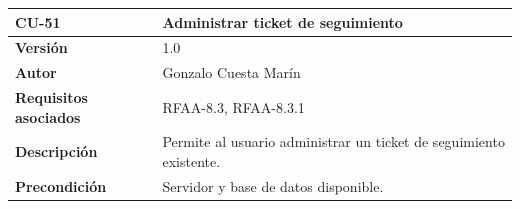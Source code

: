 \documentclass[
]{article}
\begin{document}
\begin{longtable}[]{@{}ll@{}}
\toprule
\begin{minipage}[b]{0.26\columnwidth}\raggedright
\textbf{CU-51}\strut
\end{minipage} & \begin{minipage}[b]{0.68\columnwidth}\raggedright
\textbf{Administrar ticket de seguimiento}\strut
\end{minipage}\tabularnewline
\midrule
\endhead
\begin{minipage}[t]{0.26\columnwidth}\raggedright
\textbf{Versión}\strut
\end{minipage} & \begin{minipage}[t]{0.68\columnwidth}\raggedright
1.0\strut
\end{minipage}\tabularnewline
\begin{minipage}[t]{0.26\columnwidth}\raggedright
\textbf{Autor}\strut
\end{minipage} & \begin{minipage}[t]{0.68\columnwidth}\raggedright
Gonzalo Cuesta Marín\strut
\end{minipage}\tabularnewline
\begin{minipage}[t]{0.26\columnwidth}\raggedright
\textbf{Requisitos asociados}\strut
\end{minipage} & \begin{minipage}[t]{0.68\columnwidth}\raggedright
RFAA-8.3, RFAA-8.3.1\strut
\end{minipage}\tabularnewline
\begin{minipage}[t]{0.26\columnwidth}\raggedright
\textbf{Descripción}\strut
\end{minipage} & \begin{minipage}[t]{0.68\columnwidth}\raggedright
Permite al usuario administrar un ticket de seguimiento existente.\strut
\end{minipage}\tabularnewline
\begin{minipage}[t]{0.26\columnwidth}\raggedright
\textbf{Precondición}\strut
\end{minipage} & \begin{minipage}[t]{0.68\columnwidth}\raggedright
Servidor y base de datos disponible.


\end{minipage}
\end{longtable}
\end{document}
